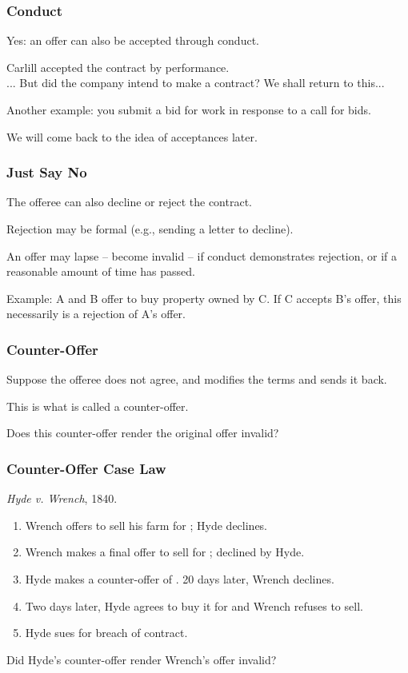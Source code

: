 \begin{frame}
\frametitle{Conduct}

Yes: an offer can also be accepted through \alert{conduct}.
 
Carlill accepted the contract by performance.\\
\quad ... But did the company intend to make a contract? We shall return to this...

Another example: you submit a bid for work in response to a call for bids.

We will come back to the idea of acceptances later.

\end{frame}



\begin{frame}
\frametitle{Just Say No}

The offeree can also decline or reject the contract. 

Rejection may be formal (e.g., sending a letter to decline).

An offer may \alert{lapse} -- become invalid -- if conduct demonstrates rejection, or if a reasonable amount of time has passed.

Example: A and B offer to buy property owned by C. If C accepts B's offer, this necessarily is a rejection of A's offer.

\end{frame}



\begin{frame}
\frametitle{Counter-Offer}

Suppose the offeree does not agree, and modifies the terms and sends it back. 

This is what is called a \alert{counter-offer}. 

Does this counter-offer render the original offer invalid?

\end{frame}



\begin{frame}
\frametitle{Counter-Offer Case Law}

\textit{Hyde v. Wrench}, 1840.

\begin{enumerate}
	\item Wrench offers to sell his farm for ; Hyde declines.
	\item Wrench makes a final offer to sell for ; declined by Hyde.
	\item Hyde makes a counter-offer of . 20 days later, Wrench declines.
	\item Two days later, Hyde agrees to buy it for  and Wrench refuses to sell.
	\item Hyde sues for breach of contract.
\end{enumerate}

Did Hyde's counter-offer render Wrench's  offer invalid?

\end{frame}



